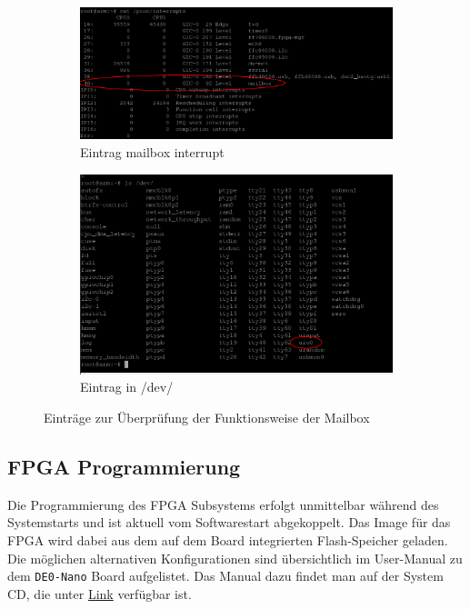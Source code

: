 \begin{figure}
	\centering
	\begin{subfigure}[a]{0.7\textwidth}
	\includegraphics[width=1\linewidth]{Abb/arm_interrupts.png}
	\caption{Eintrag mailbox interrupt}
	\label{SW:arm:interrupts}
	\end{subfigure}
	\begin{subfigure}[b]{0.7\textwidth}
	\includegraphics[width=1\textwidth]{Abb/arm_devices.png}
	\caption{Eintrag in /dev/}
	\label{SW:arm:devices}
	\end{subfigure}
	\caption{Einträge zur Überprüfung der Funktionsweise der Mailbox}
\end{figure}


\subsection{FPGA Programmierung}
Die Programmierung des \ac{FPGA} Subsystems erfolgt unmittelbar während des Systemstarts und ist aktuell vom Softwarestart abgekoppelt. Das Image für das \ac{FPGA} wird dabei aus dem auf dem Board integrierten Flash-Speicher geladen. Die möglichen alternativen Konfigurationen sind übersichtlich im User-Manual zu dem \texttt{DE0-Nano} Board aufgelistet. Das Manual dazu findet man auf der System CD, die unter \href{http://www.terasic.com/downloads/cd-rom/de0-nano-soc/}{Link} verfügbar ist.\\

